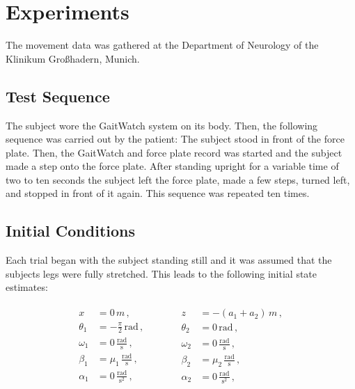 \section{Experiments}

The movement data was gathered at the Department of Neurology of the Klinikum Großhadern, Munich.

\subsection{Test Sequence}

The subject wore the GaitWatch system on its body. Then, the following sequence was carried out by the patient: The subject stood in front of the force plate. Then, the GaitWatch and force plate record was started and the subject made a step onto the force plate. After standing upright for a variable time of two to ten seconds the subject left the force plate, made a few steps, turned left, and stopped in front of it again. This sequence was repeated ten times.

\subsection{Initial Conditions}

Each trial began with the subject standing still and it was assumed that the subjects legs were fully stretched. This leads to the following initial state estimates:

\begin{equation}
\begin{matrix}
	\begin{split}
	  x &= 0\,m\,, \\
	  \theta_1 &= -\frac{\pi}{2}\,\mbox{rad}\,, \\
	  \omega_1 &= 0\,\frac{\mbox{rad}}{\mbox{s}}\,, \\
	  \beta_1 &= \mu_1\,\frac{\mbox{rad}}{\mbox{s}}\,, \\
	  \alpha_1 &= 0\,\frac{\mbox{rad}}{\mbox{s}^2}\,,
\end{split} \qquad \quad
    \begin{split}
   	  z &= -(a_1+a_2)\,m\,, \\
	  \theta_2 &= 0\,\mbox{rad}\,, \mathrel{\phantom{\frac{\pi}{2}}}\\
	  \omega_2 &= 0\,\frac{\mbox{rad}}{\mbox{s}}\,, \\
	  \beta_2 &= \mu_2\,\frac{\mbox{rad}}{\mbox{s}}\,, \\
	  \alpha_2 &= 0\,\frac{\mbox{rad}}{\mbox{s}^2}\,,  
\end{split}
\end{matrix}
\end{equation}

